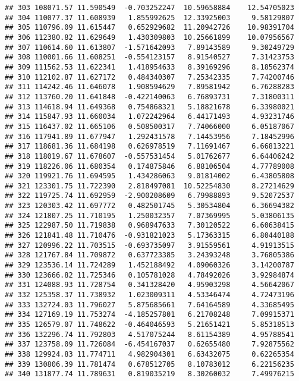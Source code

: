 \documentclass[
]{article}
\begin{document}
\begin{verbatim}
## 303 108071.57 11.590549  -0.703252247  10.59658884    12.54705023
## 304 110077.37 11.608939   1.855992625  12.33925003     9.58129807
## 305 110796.09 11.615447   0.652929682  11.20942726    10.98391704
## 306 112380.82 11.629649   1.430309803  10.25661899    10.07956567
## 307 110614.60 11.613807  -1.571642093   7.89143589     9.30249729
## 308 110001.66 11.608251  -0.554123157   8.91540527     7.31423753
## 309 111562.53 11.622341   1.418954633   8.39169296     8.18562374
## 310 112102.87 11.627172   0.484340307   7.25342335     7.74200746
## 311 114242.46 11.646078   1.908594629   7.89581942     6.76288283
## 312 113760.20 11.641848  -0.422140063   6.76893731     7.31800311
## 313 114618.94 11.649368   0.754868321   5.18821678     6.33980021
## 314 115847.93 11.660034   1.072242964   6.44171493     4.93231746
## 315 116437.02 11.665106   0.508500317   7.74066000     6.05187067
## 316 117941.89 11.677947   1.292431578   7.14453956     7.18452996
## 317 118681.36 11.684198   0.626978519   7.11691467     6.66813221
## 318 118019.67 11.678607  -0.557531454   5.01762677     6.64406242
## 319 118226.06 11.680354   0.174875846   6.88106504     4.77789008
## 320 119921.76 11.694595   1.434286063   9.01814002     6.43805808
## 321 123301.75 11.722390   2.818497081  10.52254830     8.27214629
## 322 119725.74 11.692959  -2.900208609   6.79988893     9.52072537
## 323 120303.42 11.697772   0.482501745   5.30534804     6.36694382
## 324 121807.25 11.710195   1.250032357   7.07369995     5.03806135
## 325 122987.50 11.719838   0.968947633   7.30120522     6.60638415
## 326 121841.48 11.710476  -0.931821023   5.17363315     6.80440188
## 327 120996.22 11.703515  -0.693735097   3.91559561     4.91913515
## 328 121767.84 11.709872   0.637723385   3.24393248     3.76805386
## 329 123536.14 11.724289   1.452188492   4.09060326     3.14200787
## 330 123666.82 11.725346   0.105781028   4.78492026     3.92984874
## 331 124088.93 11.728754   0.341328420   4.95903298     4.56642067
## 332 125358.37 11.738932   1.023009311   4.53346474     4.72473196
## 333 132724.03 11.796027   5.875685661   7.64164589     4.33685495
## 334 127169.19 11.753274  -4.185257801   6.21708248     7.09915371
## 335 126579.07 11.748622  -0.464046593   5.21651421     5.85318513
## 336 132296.74 11.792803   4.517075244   8.61154389     4.95788541
## 337 123758.09 11.726084  -6.454167037   0.62655480     7.92875562
## 338 129924.83 11.774711   4.982904301   6.63432075     0.62265354
## 339 130806.39 11.781474   0.678512705   8.10783012     6.22156235
## 340 131877.74 11.789631   0.819035219   8.30260032     7.49976215

\end{verbatim}
\end{document}
